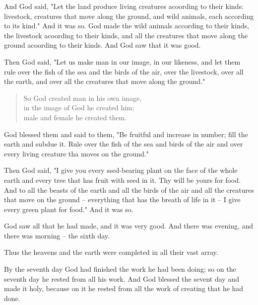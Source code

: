 \V And God said, "Let the land produce living creatures acoording to their
kinds: livestock, creatures that move along the ground, and wild animals, each
according to its kind." And it was so. \V God made the wild animals according to
their kinds, the livestock acoording to their kinds, and all the creatures that
move along the ground acoording to their kinds. And God saw that it was good.

\V Then God said, "Let us make man in our image, in our likeness, and let them
rule over the fish of the sea and the birds of the air, over the livestock, over
all the earth, and over all the creatures that move along the ground."

\begin{quotation}
\V So God created man in his own image,\\
in the image of God he created him;\\
male and female he created them.
\end{quotation}

\V God blessed them and said to them, "Be fruitful and increase in number; fill
the earth and subdue it. Rule over the fish of the sea and birds of the air and
over every living creature tha moves on the ground."

\V Then God said, "I give you every ssed-bearing plant on the face of the whole
earth and every tree that has fruit with seed in it. Thy will be yours for food.
\V And to all the beasts of the earth and all the birds of the air and all the
creatures that move on the ground -- everything that has the breath of life in
it -- I give every green plant for food." And it was so.

\V God saw all that he had made, and it was very good. And there was evening,
and there was morning -- the sixth day.

\C Thus the heavens and the earth were completed in all their vast array.

\V By the seventh day God had finished the work he had been doing; so on the
seventh day he rested from all his work. \V And God blessed the sevent day and
made it holy, because on it he rested from all the work of creating that he had
done.
